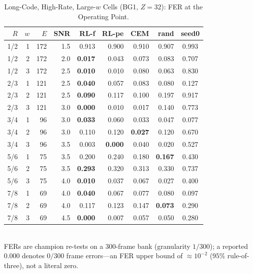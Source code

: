 \documentclass[journal]{IEEEtran}
\begin{document}
\begin{table}[t]
\centering
\caption{Long-Code, High-Rate, Large-$w$ Cells (BG1, $Z{=}32$):
FER at the Operating Point.}
\label{tab:big}
\renewcommand{\arraystretch}{1.15}
\setlength{\tabcolsep}{2.6pt}
\scriptsize
\begin{tabular}{@{}rrrrrrrrc@{}}
\toprule
$R$ & $w$ & $E$ & SNR & RL-f & RL-pe & CEM & rand & seed0\\
\midrule
1/2 & 1 & 172 & 1.5 & 0.913 & 0.900 & 0.910 & 0.907 & 0.993\\
1/2 & 2 & 172 & 2.0 & \textbf{0.017} & 0.043 & 0.073 & 0.083 & 0.707\\
1/2 & 3 & 172 & 2.5 & \textbf{0.010} & 0.010 & 0.080 & 0.063 & 0.830\\
2/3 & 1 & 121 & 2.5 & \textbf{0.040} & 0.057 & 0.083 & 0.080 & 0.127\\
2/3 & 2 & 121 & 2.5 & \textbf{0.090} & 0.117 & 0.100 & 0.197 & 0.917\\
2/3 & 3 & 121 & 3.0 & \textbf{0.000} & 0.010 & 0.017 & 0.140 & 0.773\\
3/4 & 1 &  96 & 3.0 & \textbf{0.033} & 0.060 & 0.033 & 0.047 & 0.077\\
3/4 & 2 &  96 & 3.0 & 0.110 & 0.120 & \textbf{0.027} & 0.120 & 0.670\\
3/4 & 3 &  96 & 3.5 & 0.003 & \textbf{0.000} & 0.040 & 0.020 & 0.527\\
5/6 & 1 &  75 & 3.5 & 0.200 & 0.240 & 0.180 & \textbf{0.167} & 0.430\\
5/6 & 2 &  75 & 3.5 & \textbf{0.293} & 0.320 & 0.313 & 0.330 & 0.737\\
5/6 & 3 &  75 & 4.0 & \textbf{0.010} & 0.037 & 0.067 & 0.027 & 0.400\\
7/8 & 1 &  69 & 4.0 & \textbf{0.040} & 0.067 & 0.077 & 0.080 & 0.097\\
7/8 & 2 &  69 & 4.0 & 0.117 & 0.123 & 0.147 & \textbf{0.073} & 0.290\\
7/8 & 3 &  69 & 4.5 & \textbf{0.000} & 0.007 & 0.057 & 0.050 & 0.280\\
\bottomrule
\end{tabular}
\\[3pt]
{\footnotesize FERs are champion re-tests on a $300$-frame bank
(granularity $1/300$); a reported $0.000$ denotes $0/300$ frame errors---an FER
upper bound of $\approx\!10^{-2}$ ($95\%$ rule-of-three), not a literal zero.}
\end{table}
\end{document}
